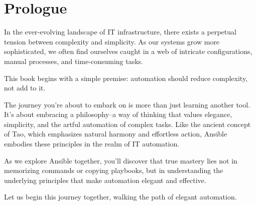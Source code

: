 \chapter*{Prologue}

In the ever-evolving landscape of IT infrastructure, there exists a perpetual tension between complexity and simplicity. As our systems grow more sophisticated, we often find ourselves caught in a web of intricate configurations, manual processes, and time-consuming tasks.

This book begins with a simple premise: automation should reduce complexity, not add to it.

The journey you're about to embark on is more than just learning another tool. It's about embracing a philosophy--a way of thinking that values elegance, simplicity, and the artful automation of complex tasks. Like the ancient concept of Tao, which emphasizes natural harmony and effortless action, Ansible embodies these principles in the realm of IT automation.

As we explore Ansible together, you'll discover that true mastery lies not in memorizing commands or copying playbooks, but in understanding the underlying principles that make automation elegant and effective.

Let us begin this journey together, walking the path of elegant automation.

\clearpage 
